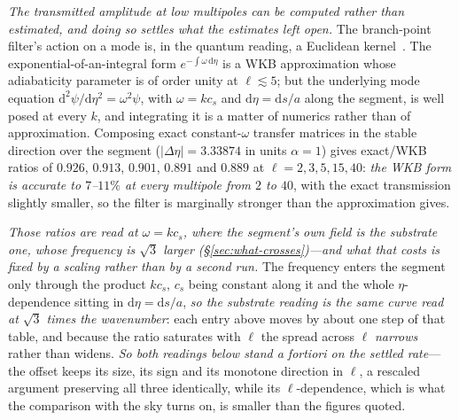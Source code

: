 \documentclass[11pt,a4paper]{article}
\theoremstyle{plain}
\theoremstyle{definition}
\theoremstyle{remark}
\newcommand{\dd}{\mathrm{d}}   %
\begin{document}
\emph{The transmitted amplitude at low multipoles can be computed rather than estimated, and doing so settles
what the estimates left open.} The branch-point filter's action on a mode is, in the quantum reading, a
Euclidean kernel~\cite{JanzenCanonicalTime}. The exponential-of-an-integral form $e^{-\int\omega\,\dd\eta}$ is
a WKB approximation whose adiabaticity parameter is of order unity at $\ell\lesssim5$; but the underlying mode
equation $\dd^{2}\psi/\dd\eta^{2}=\omega^{2}\psi$, with $\omega=kc_{s}$ and $\dd\eta=\dd s/a$ along the
segment, is well posed at every $k$, and integrating it is a matter of numerics rather than of approximation.
Composing exact constant-$\omega$ transfer matrices in the stable direction over the segment
($\lvert\Delta\eta\rvert=3.33874$ in units $\alpha=1$) gives exact/WKB ratios of $0.926$, $0.913$, $0.901$,
$0.891$ and $0.889$ at $\ell=2,3,5,15,40$: \emph{the WKB form is accurate to $7$--$11\%$ at every multipole
from $2$ to $40$}, with the exact transmission slightly smaller, so the filter is marginally stronger than the
approximation
gives.

\emph{Those ratios are read at $\omega=kc_{s}$, where the segment's own field is the substrate one, whose
frequency is $\sqrt3$ larger (\S\ref{sec:what-crosses})---and what that costs is fixed by a scaling rather
than by a second run.} The frequency enters the segment only through the product $kc_{s}$, $c_{s}$ being
constant along it and the whole $\eta$-dependence sitting in $\dd\eta=\dd s/a$, \emph{so the substrate
reading is the same curve read at $\sqrt3$ times the wavenumber}: each entry above moves by about one step
of that table, and because the ratio saturates with $\ell$ the spread across $\ell$ \emph{narrows} rather
than widens. \emph{So both readings below stand a fortiori on the settled rate}---the offset keeps its size,
its sign and its monotone direction in $\ell$, a rescaled argument preserving all three identically, while
its $\ell$-dependence, which is what the comparison with the sky turns on, is smaller than the figures
quoted.
\end{document}
